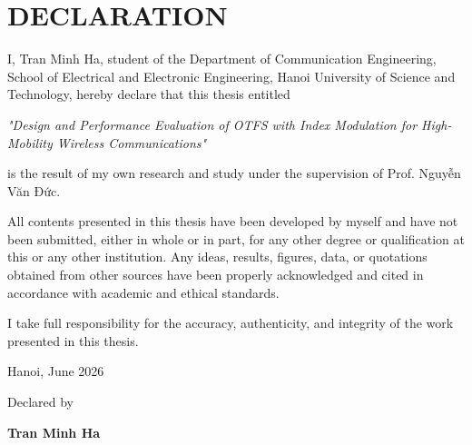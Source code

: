 \section*{DECLARATION}
\thispagestyle{plain}

I, Tran Minh Ha, student of the Department of Communication Engineering, School of Electrical and Electronic Engineering, Hanoi University of Science and Technology, hereby declare that this thesis entitled

\begin{center}
\textit{"Design and Performance Evaluation of OTFS with Index Modulation for High-Mobility Wireless Communications"}
\end{center}

is the result of my own research and study under the supervision of Prof. Nguyễn Văn Đức.

All contents presented in this thesis have been developed by myself and have not been submitted, either in whole or in part, for any other degree or qualification at this or any other institution. Any ideas, results, figures, data, or quotations obtained from other sources have been properly acknowledged and cited in accordance with academic and ethical standards.

I take full responsibility for the accuracy, authenticity, and integrity of the work presented in this thesis.

\vspace{0.8cm}

\begin{center}
\hspace{9cm}
\begin{minipage}{5cm}
\centering

Hanoi, June 2026

\vspace{0.4cm}

Declared by

\vspace{1.9cm}

\textbf{Tran Minh Ha}

\end{minipage}
\end{center}

\cleardoublepage
